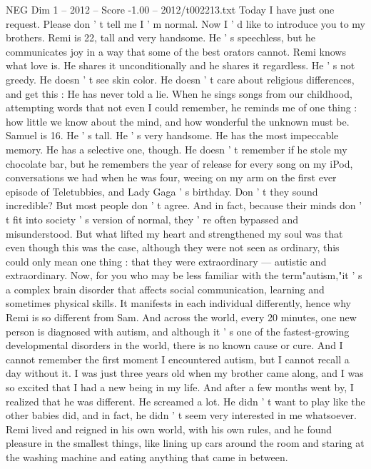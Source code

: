 \begin{textsample}{NEG Dim 1 – 2012 – Score -1.00 – 2012/t002213.txt}  \label{ex:f1_neg_043}
Today I have just one request.
Please don ' t tell me I ' m normal.
Now I ' d like to introduce you to my brothers.
Remi is 22, tall and very handsome.
He ' s speechless, but he communicates joy in a way that some of the best orators cannot.
Remi knows what love is.
He shares it unconditionally and he shares it regardless.
He ' s not greedy.
He doesn ' t see skin color.
He doesn ' t care about religious differences, and get this : He has never told a lie.
When he sings songs from our childhood, attempting words that not even I could remember, he reminds me of one thing : how little we know about the mind, and how wonderful the unknown must be.
Samuel is 16.
He ' s tall.
He ' s very handsome.
He has the most impeccable memory.
He has a selective one, though.
He doesn ' t remember if he stole my chocolate bar, but he remembers the year of release for every song on my iPod, conversations we had when he was four, weeing on my arm on the first ever episode of Teletubbies, and Lady Gaga ' s birthday.
Don ' t they sound incredible?
But most people don ' t agree.
And in fact, because their minds don ' t fit into society ' s version of normal, they ' re often bypassed and misunderstood.
But what lifted my heart and strengthened my soul was that even though this was the case, although they were not seen as ordinary, this could only mean one thing : that they were extraordinary — autistic and extraordinary.
Now, for you who may be less familiar with the term"autism,"it ' s a complex brain disorder that affects social communication, learning and sometimes physical skills.
It manifests in each individual differently, hence why Remi is so different from Sam.
And across the world, every 20 minutes, one new person is diagnosed with autism, and although it ' s one of the fastest-growing developmental disorders in the world, there is no known cause or cure.
And I cannot remember the first moment I encountered autism, but I cannot recall a day without it.
I was just three years old when my brother came along, and I was so excited that I had a new being in my life.
And after a few months went by, I realized that he was different.
He screamed a lot.
He didn ' t want to play like the other babies did, and in fact, he didn ' t seem very interested in me whatsoever.
Remi lived and reigned in his own world, with his own rules, and he found pleasure in the smallest things, like lining up cars around the room and staring at the washing machine and eating anything that came in between.

\end{textsample}
